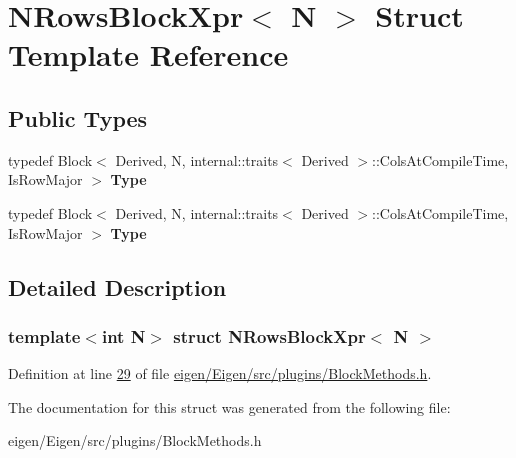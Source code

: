 \hypertarget{struct_n_rows_block_xpr}{}\section{N\+Rows\+Block\+Xpr$<$ N $>$ Struct Template Reference}
\label{struct_n_rows_block_xpr}
\subsection*{Public Types}
\begin{DoxyCompactItemize}
\item 
\mbox{\label{struct_n_rows_block_xpr_a4fbcee0ffe3913243f5bcc71e64af58d}} 
typedef Block$<$ Derived, N, internal\+::traits$<$ Derived $>$\+::Cols\+At\+Compile\+Time, Is\+Row\+Major $>$ {\bfseries Type}
\item 
\mbox{\label{struct_n_rows_block_xpr_a4fbcee0ffe3913243f5bcc71e64af58d}} 
typedef Block$<$ Derived, N, internal\+::traits$<$ Derived $>$\+::Cols\+At\+Compile\+Time, Is\+Row\+Major $>$ {\bfseries Type}
\end{DoxyCompactItemize}


\subsection{Detailed Description}
\subsubsection*{template$<$int N$>$\newline
struct N\+Rows\+Block\+Xpr$<$ N $>$}



Definition at line \hyperlink{eigen_2_eigen_2src_2plugins_2_block_methods_8h_source_l00029}{29} of file \hyperlink{eigen_2_eigen_2src_2plugins_2_block_methods_8h_source}{eigen/\+Eigen/src/plugins/\+Block\+Methods.\+h}.



The documentation for this struct was generated from the following file\+:\begin{DoxyCompactItemize}
\item 
eigen/\+Eigen/src/plugins/\+Block\+Methods.\+h\end{DoxyCompactItemize}
